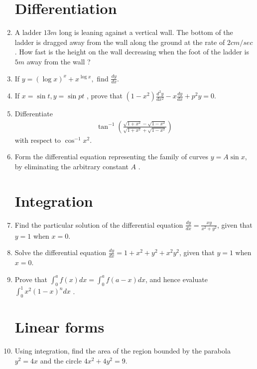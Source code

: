 \documentclass[10pt,-letter paper]{article}
\providecommand{\brak}[1]{\ensuremath{\left(#1\right)}}
\begin{document}
\begin{enumerate}
\section{Differentiation}


\item A ladder $13 m$ long is leaning against a vertical wall. The bottom of the ladder is dragged away from the wall along the ground at the rate of $2 cm/sec$. How fast is the height on the wall decreasing when the foot of the ladder is $5 m$ away from the wall ?


\item If $y=\brak{\log x}^{x}+x^{\log x},$ find $\frac{dy}{dx}$.


\item If $x = \sin t ,  y= \sin pt$ , prove that $\brak{1-x^{2}}\frac{d^{2}y}{d x^{2}} - x \frac{dy}{dx} + p^{2}y=0$.

\item Differentiate 
\begin{align*}
  \tan^{-1}\brak{\frac{\sqrt{1+x^{2}}-\sqrt{1-x^{2}}}{\sqrt{1+x^{2}}+\sqrt{1-x^{2}}}}
\end{align*} with respect to $\cos^{-1}x^{2}$.

\item Form the differential equation representing the family of curves $y = A \sin x $, by eliminating the arbitrary constant $A$ .

\section{Integration}

\item Find the particular solution of the differential equation $\frac{d y}{d x}=\frac{xy}{x^{2}+y^{2}}$, given that $y = 1$ when $x = 0$.

\item Solve the differential equation $\frac{dy} {dx} =1+x^{2}+y^{2}+x^{2}y^{2}$, given that $y = 1$ when $x = 0$.

\item Prove that $\int_{0}^{a} f \brak {x}d x = \int_{0}^{a} f\brak{a-x} d x$, and hence evaluate  $\int_{0}^{1} x^{2}\brak{1-x}^{n}dx$ .

\section{Linear forms}
\item Using integration, find the area of the region bounded by the parabola $y^{2}=4x$ and the circle $4x^{2}+4y^{2}=9$.


\end{enumerate}
\end{document}
